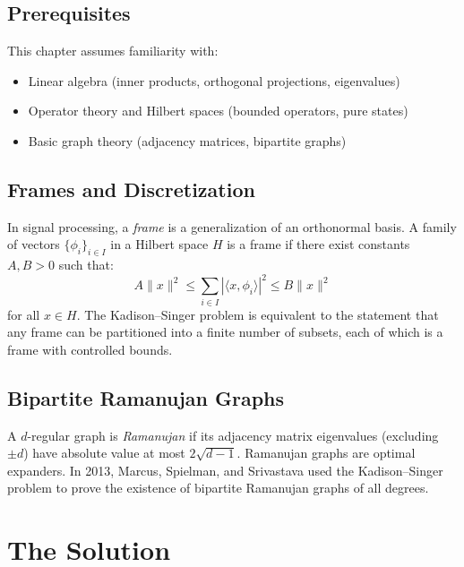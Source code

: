 \subsection{Prerequisites}
This chapter assumes familiarity with:
\begin{itemize}
\item Linear algebra (inner products, orthogonal projections, eigenvalues)
\item Operator theory and Hilbert spaces (bounded operators, pure states)
\item Basic graph theory (adjacency matrices, bipartite graphs)
\end{itemize}

\subsection{Frames and Discretization}
In signal processing, a \emph{frame} is a generalization of an orthonormal basis. A family of vectors $\{\phi_i\}_{i \in I}$ in a Hilbert space $H$ is a frame if there exist constants $A, B > 0$ such that:
\begin{equation}
A \|x\|^2 \leq \sum_{i \in I} |\langle x, \phi_i \rangle|^2 \leq B \|x\|^2
\end{equation}
for all $x \in H$. The Kadison--Singer problem is equivalent to the statement that any frame can be partitioned into a finite number of subsets, each of which is a frame with controlled bounds.

\subsection{Bipartite Ramanujan Graphs}
A $d$-regular graph is \emph{Ramanujan} if its adjacency matrix eigenvalues (excluding $\pm d$) have absolute value at most $2\sqrt{d-1}$. Ramanujan graphs are optimal expanders. In 2013, Marcus, Spielman, and Srivastava used the Kadison--Singer problem to prove the existence of bipartite Ramanujan graphs of all degrees.

\section{The Solution}

